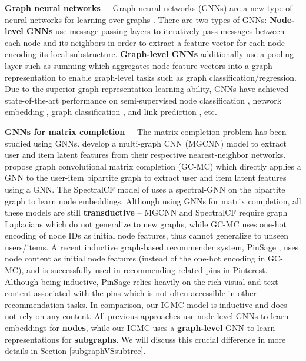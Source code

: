 \documentclass{article} \usepackage{iclr2020_conference,times}
\begin{document}
\noindent\textbf{Graph neural networks~~} 
Graph neural networks (GNNs) are a new type of neural networks for learning over graphs \citep{scarselli2009graph,bruna2013spectral,duvenaud2015convolutional,li2015gated,kipf2016semi,niepert2016learning,dai2016discriminative}. There are two types of GNNs: \textbf{Node-level GNNs} use message passing layers to iteratively pass messages between each node and its neighbors in order to extract a feature vector for each node encoding its local substructure. \textbf{Graph-level GNNs} additionally use a pooling layer such as summing which aggregates node feature vectors into a graph representation to enable graph-level tasks such as graph classification/regression. Due to the superior graph representation learning ability, GNNs have achieved state-of-the-art performance on semi-supervised node classification \citep{kipf2016semi}, network embedding \citep{hamilton2017inductive}, graph classification \citep{zhang2018end}, and link prediction \citep{zhang2018link}, etc.


\noindent \textbf{GNNs for matrix completion~~}
The matrix completion problem has been studied using GNNs. \citet{monti2017geometric} develop a multi-graph CNN (MGCNN) model to extract user and item latent features from their respective nearest-neighbor networks. \citet{berg2017graph} propose graph convolutional matrix completion (GC-MC) which directly applies a GNN to the user-item bipartite graph to extract user and item latent features using a GNN. The SpectralCF model of \citep{zheng2018spectral} uses a spectral-GNN on the bipartite graph to learn node embeddings. Although using GNNs for matrix completion, all these models are still \textbf{transductive} -- MGCNN and SpectralCF require graph Laplacians which do not generalize to new graphs, while GC-MC uses one-hot encoding of node IDs as initial node features, thus cannot generalize to unseen users/items. A recent inductive graph-based recommender system, PinSage \citep{ying2018graph}, uses node content as initial node features (instead of the one-hot encoding in GC-MC), and is successfully used in recommending related pins in Pinterest. Although being inductive, PinSage relies heavily on the rich visual and text content associated with the pins which is not often accessible in other recommendation tasks. In comparison, our IGMC model is inductive and does not rely on any content. All previous approaches use node-level GNNs to learn embeddings for \textbf{nodes}, while our IGMC uses a \textbf{graph-level} GNN to learn representations for \textbf{subgraphs}. We will discuss this crucial difference in more details in Section \ref{subgraphVSsubtree}.
\end{document}

